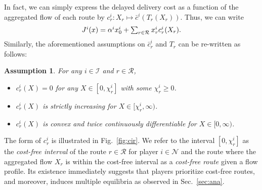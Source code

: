 \documentclass[letterpaper, 10 pt, conference]{ieeeconf}  %
\newcommand{\mc}[1]{\mathcal{#1}}
\newtheorem{prop}{Proposition}
\newtheorem{assum}{Assumption}
\begin{document}
In fact, we can simply express the delayed delivery cost as a function of the aggregated flow of each route by $c^i_r:X_r\mapsto \bar{c}^i(T_r(X_r))$.
Thus, we can write
\[
 \textstyle{
  J^i(x)=\alpha^i x^i_0 + \sum_{r\in\mc{R}} x^i_r c^i_r(X_r).
 }
\]
Similarly, the aforementioned assumptions on $\bar{c}^i_r$ and $T_r$ can be re-written as follows:
\begin{assum}\label{assum:tech}
For any $i \in \mc{I}$ and $r\in\mc{R}$,
\begin{itemize}
\item $c^i_r(X)=0$ for any $X\in[0,\chi^i_r]$ with some $\chi^i_r\geq0$.
\item $c^i_r(X)$ is strictly increasing for $X\in[\chi^i_r,\infty)$.
\item $c^i_r(X)$ is convex and twice continuously differentiable for $X\in[0,\infty)$.
\end{itemize}
\end{assum}
The form of $c^i_r$ is illustrated in Fig.~\ref{fig:cir}.
We refer to the interval $[0, \chi^i_r]$ as the \emph{cost-free interval} of the route $r\in\mc{R}$ for player $i\in\mc{N}$ and the route where the aggregated flow $X_r$ is within the cost-free interval as a \emph{cost-free route} given a flow profile.
Its existence immediately suggests that players prioritize cost-free routes, and moreover, induces multiple equilibria as observed in Sec.~\ref{sec:ana}.
\end{document}
